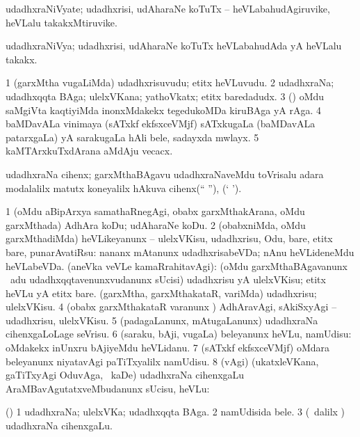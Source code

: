 \bentry
{}
\gl{\nA}
\expl{}
\bmng
udadhxraNiVyate; udadhxrisi, udAharaNe koTuTx -- heVLabahudAgiruvike, heVLalu takakxMtiruvike. 
\emng
\eentry

\bentry
{}
\gl{\gu}
\bmng
udadhxraNiVya; udadhxrisi, udAharaNe koTuTx heVLabahudAda yA heVLalu takakx. 
\emng
\eentry

\bentry
{}
\gl{\nA}
\bmng
\bnum
\num{1} (garxMtha \mo vugaLiMda) udadhxrisuvudu; etitx heVLuvudu. 
\num{2} udadhxraNa; udadhxqqta BAga; ulelxVKana; yathoVkatx; etitx baredadudx. 
\num{3} (\saM) oMdu saMgiVta kaqtiyiMda inonxMdakekx tegedukoMDa kiruBAga yA rAga. 
\num{4} baMDavALa vinimaya (sATxkf ekfsxceVMjf) sATxkugaLa (baMDavALa patarxgaLa) yA sarakugaLa hAli bele, sadayxda mwlayx. 
\num{5} kaMTArxkuTxdArana aMdAju vecacx. 
\enum
\emng
\eentry

\bentry
{}
\gl{\nA}
\bmng
udadhxraNa cihenx; garxMthaBAgavu udadhxraNaveMdu toVrisalu adara modalalilx matutx koneyalilx hAkuva cihenx(`` \quad ''), (` \quad '). 
\emng
\eentry

\bentry
{}
\gl{\sakirx}
\bmng
\bnum
\num{1} (oMdu aBipArxya samathaRnegAgi, obabx garxMthakArana, oMdu garxMthada) AdhAra koDu; udAharaNe koDu. 
\num{2} (obabxniMda, oMdu garxMthadiMda) heVLikeyanunx -- ulelxVKisu, udadhxrisu, Odu, bare, etitx bare, punarAvatiRsu:  nananx mAtanunx udadhxrisabeVDa; nAnu heVLideneMdu heVLabeVDa. 
 (aneVka veVLe kamaRrahitavAgi): 
\banum
{} (oMdu garxMthaBAgavanunx \sA\ adu udadhxqqtavenunxvudanunx sUcisi) udadhxrisu yA ulelxVKisu; etitx heVLu yA etitx bare. 
 (garxMtha, garxMthakataR, \mo variMda) udadhxrisu; ulelxVKisu. 
\eanum
\numie
\num{4} (obabx garxMthakataR \mo varanunx ) AdhAravAgi, sAkiSxyAgi -- udadhxrisu, ulelxVKisu. 
\num{5} (padagaLanunx, mAtugaLanunx) udadhxraNa cihenxgaLoLage seVrisu. 
\num{6} (saraku, bAji, \mo vugaLa) beleyanunx heVLu, namUdisu:  oMdakekx inUnxru bAjiyeMdu heVLidanu. 
\num{7} (sATxkf ekfsxceVMjf) oMdara beleyanunx niyatavAgi paTiTxyalilx namUdisu. 
\num{8} (\BAavayx vAgi) (ukatxleVKana, gaTiTxyAgi OduvAga, \mo\ kaDe) udadhxraNa cihenxgaLu AraMBavAgutatxveMbudanunx sUcisu, heVLu:  
\enum
\emng
\eentry

\bentry
{}
\gl{\nA}
\bmng
(\AmA) 
\bnum
\num{1} udadhxraNa; ulelxVKa; udadhxqqta BAga. 
\num{2} namUdisida bele. 
\num{3} (\sA\ \bava dalilx ) udadhxraNa cihenxgaLu. 
\enum
\emng
\eentry

